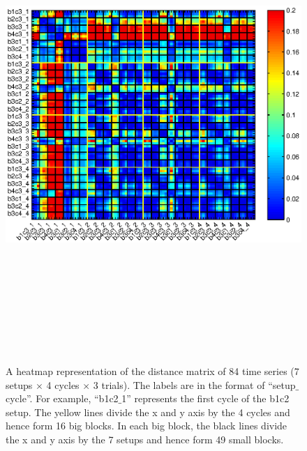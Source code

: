 \begin{figure}
\centering

\begin{minipage}[t]{1\textwidth}
\hspace{-1.5cm}
  \includegraphics[width=18cm,height=18cm]{./fig_cha4/heatmap_all6_3.eps}
  \caption{  {A heatmap representation of the distance matrix of 84 time series (7 setups $\times$ 4 cycles $\times$ 3 trials). The labels are in the format of ``setup$\_$cycle''. For example, ``b1c2$\_$1'' represents the first cycle of the b1c2 setup. The yellow lines divide the x and y axis by the 4 cycles and hence form 16 big blocks. In each big block, the black lines divide the x and y axis by the 7 setups and hence form 49 small blocks. }
}
\label{fig:heatmap}
\end{minipage}

\end{figure}




